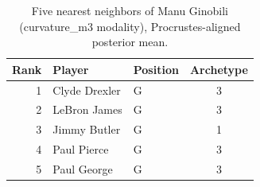 \begin{table}[htbp]
  \centering\small
  \begin{tabular}{rllc}
    \toprule
    Rank & Player & Position & Archetype \\
    \midrule
    1 & Clyde Drexler & G & 3 \\
    2 & LeBron James & G & 3 \\
    3 & Jimmy Butler & G & 1 \\
    4 & Paul Pierce & G & 3 \\
    5 & Paul George & G & 3 \\
    \bottomrule
  \end{tabular}
  \caption{Five nearest neighbors of Manu Ginobili (curvature_m3 modality), Procrustes-aligned posterior mean.}
  \label{tab:Manu_Ginobili_neighbors_curvature_m3}
\end{table}

